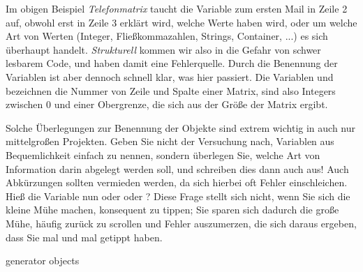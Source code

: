 \begin{hintbox}
Im obigen Beispiel \emph{Telefonmatrix} taucht die Variable  zum ersten Mail in Zeile 2 auf, obwohl erst in Zeile 3 erklärt wird, welche Werte  haben wird, oder um welche Art von Werten (Integer, Fließkommazahlen, Strings, Container, ...) es sich überhaupt handelt. \emph{Strukturell} kommen wir also in die Gefahr von schwer lesbarem Code, und haben damit eine Fehlerquelle. Durch die Benennung der Variablen ist aber dennoch schnell klar, was hier passiert. Die Variablen  und  bezeichnen die Nummer von Zeile und Spalte einer Matrix, sind also Integers zwischen 0 und einer Obergrenze, die sich aus der Größe der Matrix ergibt.

Solche Überlegungen zur Benennung der Objekte sind extrem wichtig in auch nur mittelgroßen Projekten. Geben Sie nicht der Versuchung nach, Variablen aus Bequemlichkeit einfach  zu nennen, sondern überlegen Sie, welche Art von Information darin abgelegt werden soll, und schreiben dies dann auch aus! Auch Abkürzungen sollten vermieden werden, da sich hierbei oft Fehler einschleichen. Hieß die Variable nun  oder  oder ? Diese Frage stellt sich nicht, wenn Sie sich die kleine Mühe machen, konsequent  zu tippen; Sie sparen sich dadurch die große Mühe, häufig zurück zu scrollen und Fehler auszumerzen, die sich daraus ergeben, dass Sie mal  und mal  getippt haben.
\end{hintbox}
generator objects
